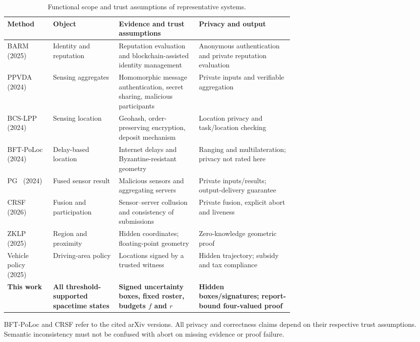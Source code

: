 \begin{table}[htbp]\centering\footnotesize
\caption{Functional scope and trust assumptions of representative systems.}\label{tab:related-work}
\begin{tabularx}{\linewidth}{@{}p{0.16\linewidth}p{0.23\linewidth}p{0.29\linewidth}X@{}}
\toprule Method & Object & Evidence and trust assumptions & Privacy and output\\\midrule
BARM~\cite{Zheng2025BARM} (2025) & Identity and reputation & Reputation evaluation and blockchain-assisted identity management & Anonymous authentication and private reputation evaluation\\
PPVDA~\cite{Zhou2024} (2024) & Sensing aggregates & Homomorphic message authentication, secret sharing, malicious participants & Private inputs and verifiable aggregation\\
BCS-LPP~\cite{Shen2024} (2024) & Sensing location & Geohash, order-preserving encryption, deposit mechanism & Location privacy and task/location checking\\
BFT-PoLoc~\cite{BFTPoLoc} (2024) & Delay-based location & Internet delays and Byzantine-resistant geometry & Ranging and multilateration; privacy not rated here\\
PG~\cite{PG} (2024) & Fused sensor result & Malicious sensors and aggregating servers & Private inputs/results; output-delivery guarantee\\
CRSF~\cite{CRSF} (2026) & Fusion and participation & Sensor--server collusion and consistency of submissions & Private fusion, explicit abort and liveness\\
ZKLP~\cite{ZKLP} (2025) & Region and proximity & Hidden coordinates; floating-point geometry & Zero-knowledge geometric proof\\
Vehicle policy~\cite{VehiclePolicy} (2025) & Driving-area policy & Locations signed by a trusted witness & Hidden trajectory; subsidy and tax compliance\\
\textbf{This work} & \textbf{All threshold-supported spacetime states} & \textbf{Signed uncertainty boxes, fixed roster, budgets $f$ and $r$} & \textbf{Hidden boxes/signatures; report-bound four-valued proof}\\\bottomrule
\end{tabularx}
\par\smallskip\raggedright\footnotesize BFT-PoLoc and CRSF refer to the cited arXiv versions. All privacy and correctness claims depend on their respective trust assumptions. Semantic inconsistency must not be confused with abort on missing evidence or proof failure.
\end{table}

